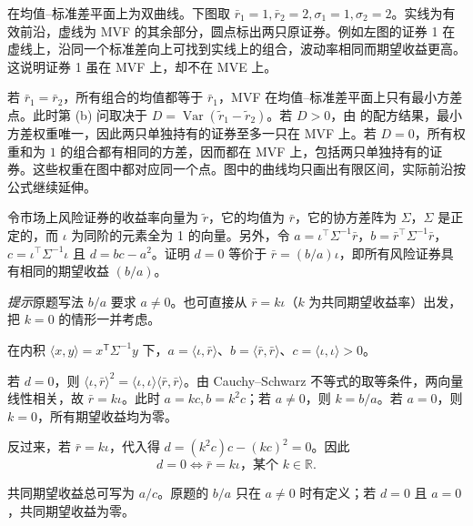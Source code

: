\begin{solution}[blank-type=manual,blank-vsep=7\baselineskip]
\begin{enumerate}[label=(\alph*)]
在均值--标准差平面上为双曲线。下图取 $\bar r_1=1,\bar r_2=2,\sigma_1=1,\sigma_2=2$。实线为有效前沿，虚线为 MVF 的其余部分，圆点标出两只原证券。例如左图的证券 1 在虚线上，沿同一个标准差向上可找到实线上的组合，波动率相同而期望收益更高。这说明证券 1 虽在 MVF 上，却不在 MVE 上。
\begin{center}
%
\end{center}

若 $\bar r_1=\bar r_2$，所有组合的均值都等于 $\bar r_1$，MVF 在均值--标准差平面上只有最小方差点。此时第 (b) 问取决于 $D=\operatorname{Var}(\tilde r_1-\tilde r_2)$。若 $D>0$，由 的配方结果，最小方差权重唯一，因此两只单独持有的证券至多一只在 MVF 上。若 $D=0$，所有权重和为 $1$ 的组合都有相同的方差，因而都在 MVF 上，包括两只单独持有的证券。这些权重在图中都对应同一个点。图中的曲线均只画出有限区间，实际前沿按公式继续延伸。\qedhere
\end{enumerate}
\end{solution}

\par\noindent\begin{minipage}{\linewidth}
\begin{problem}
 令市场上风险证券的收益率向量为 $\tilde{r}$，它的均值为 $\bar{r}$，它的协方差阵为 $\Sigma$，$\Sigma$ 是正定的，而 $\iota$ 为同阶的元素全为 1 的向量。另外，令 $a=\iota^{\top}\Sigma^{-1}\bar{r}$，$b=\bar{r}^{\top}\Sigma^{-1}\bar{r}$，$c=\iota^{\top}\Sigma^{-1}\iota$ 且 $d=bc-a^{2}$。证明 $d=0$ 等价于 $\bar{r}=(b/a)\iota$，即所有风险证券具有相同的期望收益 $(b/a)$。
\par\textit{提示}\quad 原题写法 $b/a$ 要求 $a\ne0$。也可直接从 $\bar r=k\iota$（$k$ 为共同期望收益率）出发，把 $k=0$ 的情形一并考虑。
\end{problem}
\end{minipage}\par
{}
\begin{solution}[label-content={证明}]
在内积 $\langle x,y\rangle=x^{\mathsf T}\Sigma^{-1}y$ 下，$a=\langle\iota,\bar r\rangle$、$b=\langle\bar r,\bar r\rangle$、$c=\langle\iota,\iota\rangle>0$。

若 $d=0$，则 $\langle\iota,\bar r\rangle^2=\langle\iota,\iota\rangle\langle\bar r,\bar r\rangle$。由 Cauchy--Schwarz 不等式的取等条件，两向量线性相关，故 $\bar r=k\iota$。此时 $a=kc,b=k^2c$；若 $a\ne0$，则 $k=b/a$。若 $a=0$，则 $k=0$，所有期望收益均为零。

反过来，若 $\bar r=k\iota$，代入得 $d=(k^2c)c-(kc)^2=0$。因此
\[
 \boxed{d=0\iff\bar r=k\iota\text{，某个 }k\in\mathbb R}.
\]

共同期望收益总可写为 $a/c$。原题的 $b/a$ 只在 $a\ne0$ 时有定义；若 $d=0$ 且 $a=0$，共同期望收益为零。
\end{solution}

